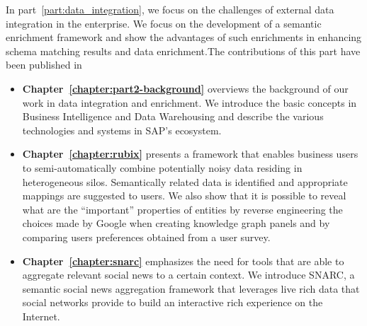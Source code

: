 In part~\ref{part:data_integration}, we focus on the challenges of external data integration in the enterprise. We focus on the development of a semantic enrichment framework and show the advantages of such enrichments in enhancing schema matching results and data enrichment.The contributions of this part have been published in ~\cite{Assaf:WOD:12,Assaf:ESWC:13}

\begin{itemize}
  \item \textbf{Chapter~\ref{chapter:part2-background}} overviews the background of our work in data integration and enrichment. We introduce the basic concepts in Business Intelligence and Data Warehousing and describe the various technologies and systems in SAP's ecosystem.
	\item \textbf{Chapter~\ref{chapter:rubix}} presents a framework that enables business users to semi-automatically combine potentially noisy data residing in heterogeneous silos. Semantically related data is identified and appropriate mappings are suggested to users. We also show that it is possible to reveal what are the ``important'' properties of entities by reverse engineering the choices made by Google when creating knowledge graph panels and by comparing users preferences obtained from a user survey.
	\item \textbf{Chapter~\ref{chapter:snarc}} emphasizes the need for tools that are able to aggregate relevant social news to a certain context. We introduce SNARC, a semantic social news aggregation framework that leverages live rich data that social networks provide to build an interactive rich experience on the Internet.
\end{itemize}